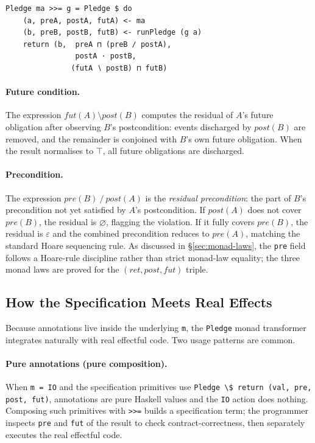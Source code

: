 \documentclass[acmsmall,screen]{acmart}
\newcommand{\pre}{\mathit{pre}}
\newcommand{\post}{\mathit{post}}
\newcommand{\fut}{\mathit{fut}}
\newcommand{\ret}{\mathit{ret}}
\newcommand{\lquot}{\mathbin{\setminus}}   %
\newcommand{\rquot}{\mathbin{/}}           %
\begin{document}
\begin{lstlisting}
Pledge ma >>= g = Pledge $ do
    (a, preA, postA, futA) <- ma
    (b, preB, postB, futB) <- runPledge (g a)
    return (b,  preA ⊓ (preB ∕ postA),
                postA · postB,
               (futA ∖ postB) ⊓ futB)
\end{lstlisting}

\paragraph{Future condition.}
The expression $\fut(A) \lquot \post(B)$ computes the residual of $A$'s
future obligation after observing $B$'s postcondition: events discharged
by $\post(B)$ are removed, and the remainder is conjoined with $B$'s own
future obligation.
When the result normalises to $\top$, all future obligations are
discharged.

\paragraph{Precondition.}
The expression $\pre(B) \rquot \post(A)$ is the \emph{residual precondition}:
the part of $B$'s precondition not yet satisfied by $A$'s postcondition.
If $\post(A)$ does not cover $\pre(B)$, the residual is $\varnothing$,
flagging the violation.
If it fully covers $\pre(B)$, the residual is $\varepsilon$ and the
combined precondition reduces to $\pre(A)$, matching the standard Hoare
sequencing rule.
As discussed in \S\ref{sec:monad-laws}, the \lstinline{pre} field follows
a Hoare-rule discipline rather than strict monad-law equality; the three
monad laws are proved for the $(\ret, \post, \fut)$ triple.

\subsection{How the Specification Meets Real Effects}
\label{sec:effects}

Because annotations live inside the underlying \lstinline{m}, the
\lstinline{Pledge} monad transformer integrates naturally with real
effectful code.
Two usage patterns are common.

\paragraph{Pure annotations (pure composition).}
When \lstinline{m = IO} and the specification primitives use
\lstinline{Pledge \$ return (val, pre, post, fut)}, annotations are
pure Haskell values and the \lstinline{IO} action does nothing.
Composing such primitives with \lstinline{>>=} builds a specification
term; the programmer inspects \lstinline{pre} and \lstinline{fut} of
the result to check contract-correctness, then separately executes
the real effectful code.
\end{document}
